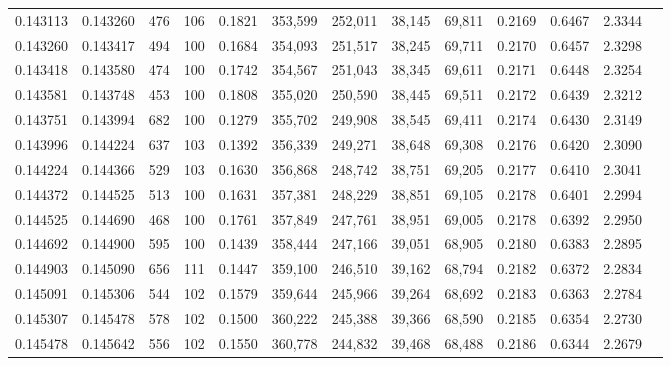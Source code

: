 \begin{tabular}{rrrrrrrrrrrrr}
0.143113 & 0.143260 &   476 & 106 &                                     0.1821 & 353,599 & 252,011 &  38,145 &  69,811 & 0.2169 & 0.6467 & 2.3344 \\
0.143260 & 0.143417 &   494 & 100 &                                     0.1684 & 354,093 & 251,517 &  38,245 &  69,711 & 0.2170 & 0.6457 & 2.3298 \\
0.143418 & 0.143580 &   474 & 100 &                                     0.1742 & 354,567 & 251,043 &  38,345 &  69,611 & 0.2171 & 0.6448 & 2.3254 \\
0.143581 & 0.143748 &   453 & 100 &                                     0.1808 & 355,020 & 250,590 &  38,445 &  69,511 & 0.2172 & 0.6439 & 2.3212 \\
0.143751 & 0.143994 &   682 & 100 &                                     0.1279 & 355,702 & 249,908 &  38,545 &  69,411 & 0.2174 & 0.6430 & 2.3149 \\
0.143996 & 0.144224 &   637 & 103 &                                     0.1392 & 356,339 & 249,271 &  38,648 &  69,308 & 0.2176 & 0.6420 & 2.3090 \\
0.144224 & 0.144366 &   529 & 103 &                                     0.1630 & 356,868 & 248,742 &  38,751 &  69,205 & 0.2177 & 0.6410 & 2.3041 \\
0.144372 & 0.144525 &   513 & 100 &                                     0.1631 & 357,381 & 248,229 &  38,851 &  69,105 & 0.2178 & 0.6401 & 2.2994 \\
0.144525 & 0.144690 &   468 & 100 &                                     0.1761 & 357,849 & 247,761 &  38,951 &  69,005 & 0.2178 & 0.6392 & 2.2950 \\
0.144692 & 0.144900 &   595 & 100 &                                     0.1439 & 358,444 & 247,166 &  39,051 &  68,905 & 0.2180 & 0.6383 & 2.2895 \\
0.144903 & 0.145090 &   656 & 111 &                                     0.1447 & 359,100 & 246,510 &  39,162 &  68,794 & 0.2182 & 0.6372 & 2.2834 \\
0.145091 & 0.145306 &   544 & 102 &                                     0.1579 & 359,644 & 245,966 &  39,264 &  68,692 & 0.2183 & 0.6363 & 2.2784 \\
0.145307 & 0.145478 &   578 & 102 &                                     0.1500 & 360,222 & 245,388 &  39,366 &  68,590 & 0.2185 & 0.6354 & 2.2730 \\
0.145478 & 0.145642 &   556 & 102 &                                     0.1550 & 360,778 & 244,832 &  39,468 &  68,488 & 0.2186 & 0.6344 & 2.2679 \\

\end{tabular}
